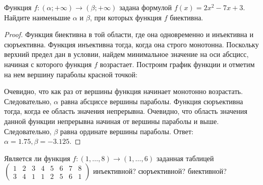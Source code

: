 
\renewcommand*{\proofname}{Решение}

\begin{problem}
	Функция $f : (\alpha;+\infty)\rightarrow(\beta;+\infty)$ задана формулой $f(x)=2x^2-7x+3$. Найдите наименьшие $\alpha$ и $\beta$, при которых функция $f$ биективна.
\end{problem}

\begin{proof}
	Функция биективна в той области, где она одновременно и инъективна и сюръективна.
	\newline
	Функция инъективна тогда, когда она строго монотонна. Поскольку верхний предел дан в условии, найдем минимальное значение на оси абсцисс, начиная с которого функция $f$ возрастает.
	\newline
	Построим график функции и отметим на нем вершину параболы красной точкой:
	\begin {center}
	\end {center}
	Очевидно, что как раз от вершины функция начинает монотонно возрастать. Следовательно, $\alpha$ равна абсциссе вершины параболы.
	\newline
	Функция сюръективна тогда, когда ее область значения непрерывна. Очевидно, что область значения данной функции непрерывна начиная от вершины параболы и выше. Следовательно, $\beta$ равна ординате вершины параболы.
	\newline 
	Ответ: $\alpha=1.75, \beta=-3.125$.
\end{proof}

\begin{problem}
	Является ли функция $f:(1,\ldots,8)\rightarrow(1,\ldots, 6)$ заданная таблицей
	$\begin{pmatrix}
		1 & 2 & 3 & 4 & 5 & 6 & 7 & 8\\
		3 & 4 & 1 & 1 & 2 & 5 & 6 & 1
	\end{pmatrix}$ инъективной? сюръективной? биективной?
\end{problem}

